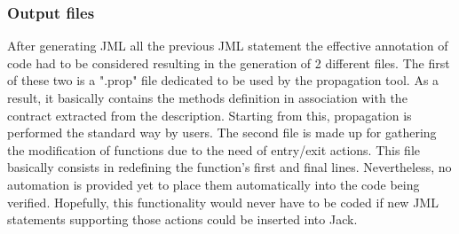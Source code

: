 \subsubsection{Output files}
After generating JML all the previous JML statement the effective annotation of code had to be considered resulting in the generation of 2 different files. The first of these two is a ".prop" file dedicated to be used by the propagation tool. As a result, it basically contains the methods definition in association with the contract  extracted from the description. Starting from this, propagation is performed the standard way by users. The second file is made up for gathering the modification of functions due to the need of entry/exit actions. This file basically consists in redefining the function's first and final lines. Nevertheless, no automation is provided yet to place them automatically into the code being verified. Hopefully, this functionality would never have to be coded if new JML statements supporting those actions could be inserted into Jack.
